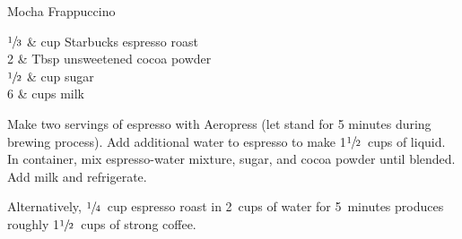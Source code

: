 \setHeadlines
{
}

\begin{recipe}
[ %
    source = A new-found coffee problem,
]
{Mocha Frappuccino}
    
    \ingredients
    {
		$\sfrac{1}{3}$ & cup Starbucks espresso roast \\
		2 & Tbsp unsweetened cocoa powder \\
		$\sfrac{1}{2}$ & cup sugar \\
		6 & cups milk \\
    }
    
    \preparation
    {
        \step Make two servings of espresso with Aeropress (let stand for 5 minutes during brewing process). Add additional water to espresso to make 1$\sfrac{1}{2}$~cups of liquid. 
		\step In container, mix espresso-water mixture, sugar, and cocoa powder until blended. 
		\step Add milk and refrigerate. 
    }
	
	\suggestion
	{
		Alternatively, $\sfrac{1}{4}$~cup espresso roast in 2~cups of water for 5~minutes produces roughly 1$\sfrac{1}{2}$~cups of strong coffee.
	}

\end{recipe}
